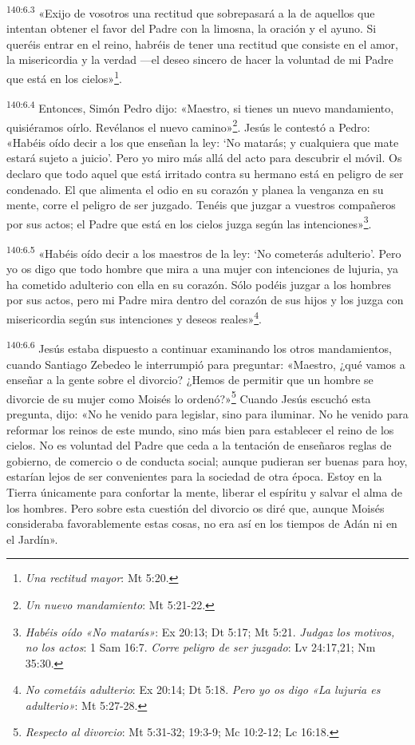 \par
\textsuperscript{140:6.3} «Exijo de vosotros una rectitud que sobrepasará a la de aquellos que intentan obtener el favor del Padre con la limosna, la oración y el ayuno. Si queréis entrar en el reino, habréis de tener una rectitud que consiste en el amor, la misericordia y la verdad ---el deseo sincero de hacer la voluntad de mi Padre que está en los cielos»\footnote{\textit{Una rectitud mayor}: Mt 5:20.}.

\par
\textsuperscript{140:6.4} Entonces, Simón Pedro dijo: «Maestro, si tienes un nuevo mandamiento, quisiéramos oírlo. Revélanos el nuevo camino»\footnote{\textit{Un nuevo mandamiento}: Mt 5:21-22.}. Jesús le contestó a Pedro: «Habéis oído decir a los que enseñan la ley: `No matarás; y cualquiera que mate estará sujeto a juicio'. Pero yo miro más allá del acto para descubrir el móvil. Os declaro que todo aquel que está irritado contra su hermano está en peligro de ser condenado. El que alimenta el odio en su corazón y planea la venganza en su mente, corre el peligro de ser juzgado. Tenéis que juzgar a vuestros compañeros por sus actos; el Padre que está en los cielos juzga según las intenciones»\footnote{\textit{Habéis oído «No matarás»}: Ex 20:13; Dt 5:17; Mt 5:21. \textit{Judgaz los motivos, no los actos}: 1 Sam 16:7. \textit{Corre peligro de ser juzgado}: Lv 24:17,21; Nm 35:30.}.

\par
\textsuperscript{140:6.5} «Habéis oído decir a los maestros de la ley: `No cometerás adulterio'. Pero yo os digo que todo hombre que mira a una mujer con intenciones de lujuria, ya ha cometido adulterio con ella en su corazón. Sólo podéis juzgar a los hombres por sus actos, pero mi Padre mira dentro del corazón de sus hijos y los juzga con misericordia según sus intenciones y deseos reales»\footnote{\textit{No cometáis adulterio}: Ex 20:14; Dt 5:18. \textit{Pero yo os digo «La lujuria es adulterio»}: Mt 5:27-28.}.

\par
\textsuperscript{140:6.6} Jesús estaba dispuesto a continuar examinando los otros mandamientos, cuando Santiago Zebedeo le interrumpió para preguntar: «Maestro, ¿qué vamos a enseñar a la gente sobre el divorcio? ¿Hemos de permitir que un hombre se divorcie de su mujer como Moisés lo ordenó?»\footnote{\textit{Respecto al divorcio}: Mt 5:31-32; 19:3-9; Mc 10:2-12; Lc 16:18.} Cuando Jesús escuchó esta pregunta, dijo: «No he venido para legislar, sino para iluminar. No he venido para reformar los reinos de este mundo, sino más bien para establecer el reino de los cielos. No es voluntad del Padre que ceda a la tentación de enseñaros reglas de gobierno, de comercio o de conducta social; aunque pudieran ser buenas para hoy, estarían lejos de ser convenientes para la sociedad de otra época. Estoy en la Tierra únicamente para confortar la mente, liberar el espíritu y salvar el alma de los hombres. Pero sobre esta cuestión del divorcio os diré que, aunque Moisés consideraba favorablemente estas cosas, no era así en los tiempos de Adán ni en el Jardín».

